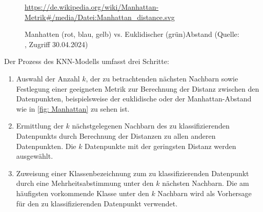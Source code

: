 \begin{figure}[H]
    \centering
    \urldef{\myurl}\url{https://de.wikipedia.org/wiki/Manhattan-Metrik#/media/Datei:Manhattan_distance.svg}
    \caption[Manhatten vs. Euklidischer Abstand]{Manhatten (rot, blau, gelb) vs. Euklidischer (grün)Abstand (Quelle: \protect\myurl{}, Zugriff 30.04.2024)}
    \label{fig: Manhattan}
\end{figure}

Der Prozess des KNN-Modells umfasst drei Schritte:
\begin{enumerate}
    \item Auswahl der Anzahl \(k\), der zu betrachtenden nächsten Nachbarn sowie Festlegung einer geeigneten Metrik zur Berechnung der Distanz zwischen den Datenpunkten, beispielsweise der euklidische oder der Manhattan-Abstand wie in \autoref{fig: Manhattan} zu sehen ist.
    \item Ermittlung der \(k\) nächstgelegenen Nachbarn des zu klassifizierenden Datenpunkts durch Berechnung der Distanzen zu allen anderen Datenpunkten. Die \(k\) Datenpunkte mit der geringsten Distanz werden ausgewählt.
    \item Zuweisung einer Klassenbezeichnung zum zu klassifizierenden Datenpunkt durch eine Mehrheitsabstimmung unter den \(k\) nächsten Nachbarn. Die am häufigsten vorkommende Klasse unter den \(k\) Nachbarn wird als Vorhersage für den zu klassifizierenden Datenpunkt verwendet.
\end{enumerate}

